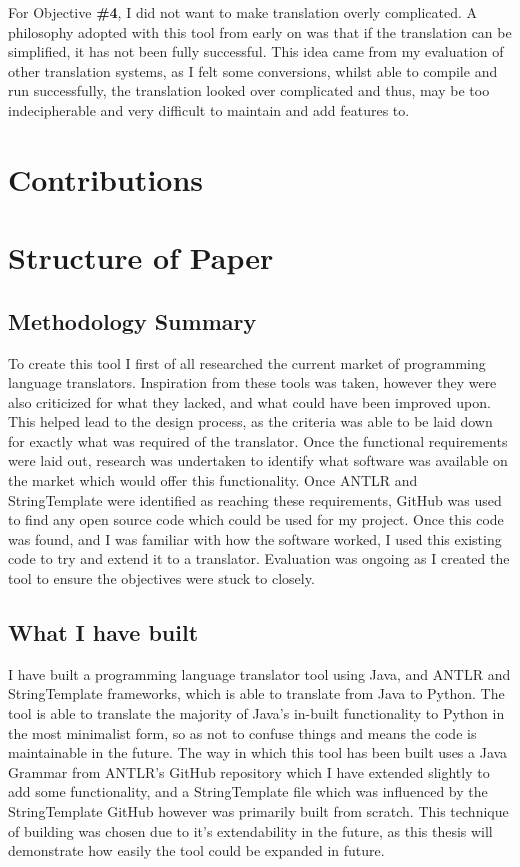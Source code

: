 \documentclass{l4proj}
\begin{document}
For Objective \textbf{\#4}, I did not want to make translation overly complicated. A philosophy adopted with this tool from early on was that if the translation can be simplified, it has not been fully successful. This idea came from my evaluation of other translation systems, as I felt some conversions, whilst able to compile and run successfully, the translation looked over complicated and thus, may be too indecipherable and very difficult to maintain and add features to.

\section{Contributions}

\section{Structure of Paper}

\subsection{Methodology Summary}
To create this tool I first of all researched the current market of programming language translators. Inspiration from these tools was taken, however they were also criticized for what they lacked, and what could have been improved upon.
This helped lead to the design process, as the criteria was able to be laid down for exactly what was required of the translator.
Once the functional requirements were laid out, research was undertaken to identify what software was available on the market which would offer this functionality. 
Once ANTLR and StringTemplate were identified as reaching these requirements, GitHub was used to find any open source code which could be used for my project.
Once this code was found, and I was familiar with how the software worked, I used this existing code to try and extend it to a translator.
Evaluation was ongoing as I created the tool to ensure the objectives were stuck to closely.

\subsection{What I have built}
I have built a programming language translator tool using Java, and ANTLR and StringTemplate frameworks, which is able to translate from Java to Python. The tool is able to translate the majority of Java's in-built functionality to Python in the most minimalist form, so as not to confuse things and means the code is maintainable in the future. The way in which this tool has been built uses a Java Grammar from ANTLR's GitHub repository which I have extended slightly to add some functionality, and a StringTemplate file which was influenced by the StringTemplate GitHub however was primarily built from scratch. This technique of building was chosen due to it's extendability in the future, as this thesis will demonstrate how easily the tool could be expanded in future.
\end{document}
